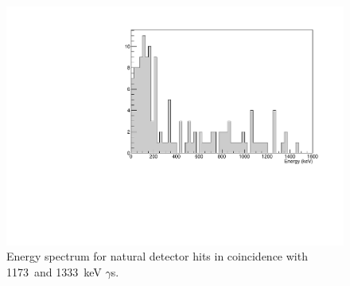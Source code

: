 \documentclass[notitlepage,rmp,aps,10pt]{revtex4-1}
\begin{document}
\begin{figure}[h]
  \centering
  \includegraphics[width=.8\linewidth]{cosmogenic_60Co}
  \caption[Measured events after all cuts with ROIs drawn]{\label{fig:60co}
    Energy spectrum for natural detector hits in coincidence with 1173~and 1333~keV $\gamma$s.
  }
\end{figure}
\end{document}
